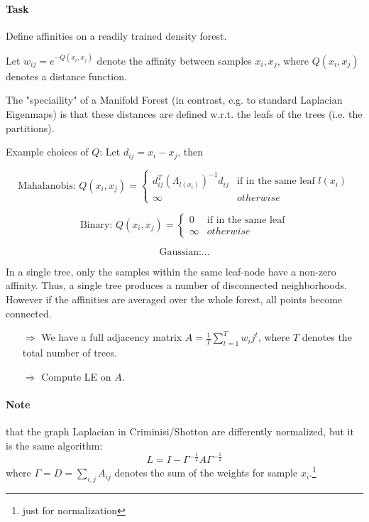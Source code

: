 \paragraph{Task} Define affinities on a readily trained density forest.

Let \(w_{ij} = e^{-Q(x_i, x_j)}\) denote the affinity between samples \(x_i,x_j\), where \(Q(x_i, x_j)\) denotes a distance function.

The "speciaility" of a Manifold Forest (in contrast, e.g. to standard Laplacian Eigenmaps) is that these distances are defined w.r.t. the leafs of the trees (i.e. the partitions).

\bigbreak

Example choices of \(Q\): Let \(d_{ij} = x_i - x_j\), then

\[\text{Mahalanobis: } Q(x_i, x_j) = \begin{cases} d_{ij}^T(\Lambda_{l(x_i)})^{-1} d_{ij} & \text{if in the same leaf } l(x_i) \\ \infty & otherwise \end{cases}\]

\[\text{Binary: } Q(x_i, x_j) = \begin{cases} 0 & \text{if in the same leaf} \\ \infty & otherwise \end{cases}\]

\[\text{Gaussian:} ...\]

In a single tree, only the samples within the same leaf-node have a non-zero affinity. Thus, a single tree produces a number of disconnected neighborhoods.
However if the affinities are averaged over the whole forest, all points become connected.

\begin{itemize}
  \item[\(\Rightarrow\)] We have a full adjacency matrix \(A = \frac{1}{T} \sum_{t=1}^T w_ij^t\), where \(T\) denotes the total number of trees.
  \item[\(\Rightarrow\)] Compute LE on \(A\).
\end{itemize}

\paragraph{Note} that the graph Laplacian in Criminisi/Shotton  are differently normalized, but it is the same algorithm:
\[L = I - \Gamma^{-\frac{1}{2}} A \Gamma^{-\frac{1}{2}}\]
where \(\Gamma = D = \sum_{i,j} A_{ij}\) denotes the sum of the weights for sample \(x_i\).\footnote{just for normalization}

